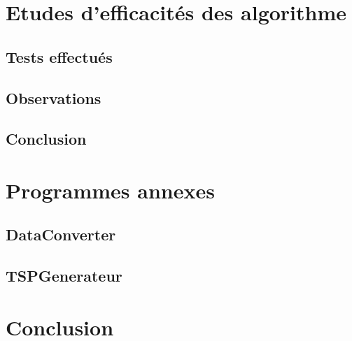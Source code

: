\documentclass[10pt,a4paper]{report}
\begin{document}
\section{Etudes d'efficacités des algorithme}

	\subsection{Tests effectués}
	
	\subsection{Observations}
	
	\subsection{Conclusion}

\section{Programmes annexes}

	\subsection{DataConverter}
	
	\subsection{TSPGenerateur}
	
\section{Conclusion}
	
\end{document}
